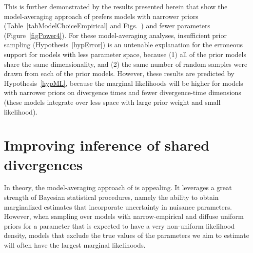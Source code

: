This is further demonstrated by the results presented herein that show the
model-averaging approach of \citet{Hickerson2013} prefers models with narrower
\divt{} priors (Table~\ref{tabModelChoiceEmpirical} and
Figs.~)
and fewer \divt{} parameters (Figure~\ref{figPower4}).
For these model-averaging analyses, insufficient prior sampling
(Hypothesis~\ref{hypError}) is an untenable explanation for the erroneous support
for models with less parameter space, because (1) all of the prior models share
the same dimensionality, and (2) the same number of random samples were drawn
from each of the prior models.
However, these results are predicted by Hypothesis~\ref{hypML}, because the
marginal likelihoods will be higher for models with narrower priors on
divergence times and fewer divergence-time dimensions (these models integrate
over less space with large prior weight and small likelihood).


\section{Improving inference of shared divergences}
In theory, the model-averaging approach of \citet{Hickerson2013} is appealing.
It leverages a great strength of Bayesian statistical procedures, namely the
ability to obtain marginalized estimates that incorporate uncertainty in
nuisance parameters.
However, when sampling over models with narrow-empirical and diffuse uniform
priors for a parameter that is expected to have a very non-uniform likelihood
density, models that exclude the true values of the parameters we aim to
estimate will often have the largest marginal likelihoods.

